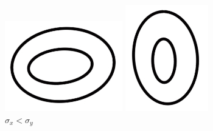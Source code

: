 \begin{figure}[ht]
\centering
\begin{minipage}{.45\linewidth}
  \includegraphics[width=\linewidth]{images/L11/wider.jpeg}
  \caption{$\sigma_x > \sigma_y$}
  \label{wider}
\end{minipage}
\hspace{.05\linewidth}
\begin{minipage}{.45\linewidth}
  \includegraphics[width=\linewidth]{images/L11/taller.jpeg}
  \caption{$\sigma_x < \sigma_y$}
  \label{taller}
\end{minipage}
\end{figure}

